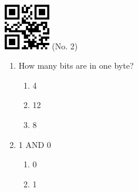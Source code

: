 \documentclass[twocolumn]{article}
\title{}
\date{}
\begin{document}

\begin{center}
 \hspace{0.2cm}
 \includegraphics[width=2cm]{qrcode-2.png}
 \hspace{0.5cm}
 \Large{  (No. 2) }
\end{center}



\begin{enumerate}



  \item How many bits are in one byte?

  \begin{enumerate}
   
   \item 4
   
   \item 12
   
   \item 8
   
  \end{enumerate}



  \item 1 AND 0

  \begin{enumerate}
   
   \item 0
   
   \item 1
   
  \end{enumerate}


\end{enumerate}


\end{document}
